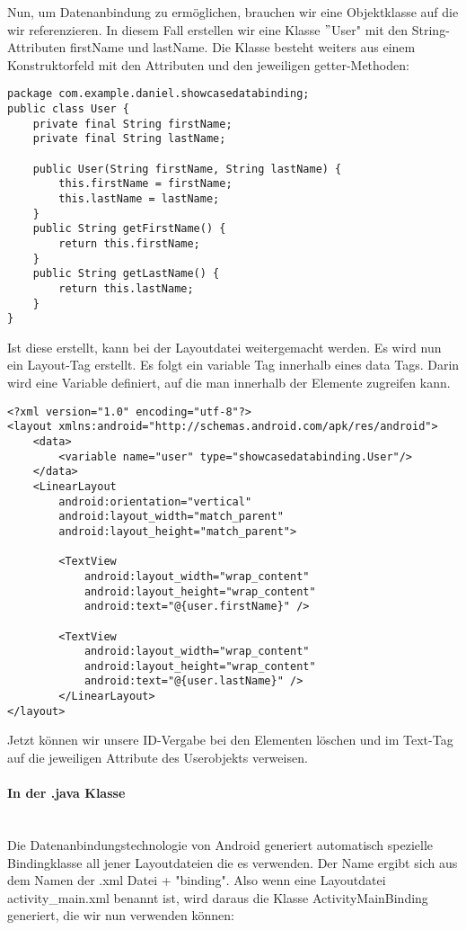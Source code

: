 \documentclass[FIPLY_base.tex]{subfiles}
\begin{document}
Nun, um Datenanbindung zu ermöglichen, brauchen wir eine Objektklasse auf die wir referenzieren. In diesem Fall erstellen wir eine Klasse $"$User" mit den String-Attributen firstName und lastName. Die Klasse besteht weiters aus einem Konstruktorfeld mit den Attributen und den jeweiligen getter-Methoden: 

\begin{lstlisting}[caption={Unsere Objektklasse die bei der Datenanbindung referenziert wird.},label=DescriptiveLabel]
package com.example.daniel.showcasedatabinding;
public class User {
    private final String firstName;
    private final String lastName;

    public User(String firstName, String lastName) {
        this.firstName = firstName;
        this.lastName = lastName;
    }
    public String getFirstName() {
        return this.firstName;
    }
    public String getLastName() {
        return this.lastName;
    }
}
\end{lstlisting}

Ist diese erstellt, kann bei der Layoutdatei weitergemacht werden. Es wird nun ein Layout-Tag erstellt. Es folgt ein variable Tag innerhalb eines data Tags. Darin wird eine Variable definiert, auf die man innerhalb der Elemente zugreifen kann.

\begin{lstlisting}[caption={Die XML Datei nach der Integration einer Datenanbindung.},label=DescriptiveLabel]
<?xml version="1.0" encoding="utf-8"?>
<layout xmlns:android="http://schemas.android.com/apk/res/android">
    <data>
	    <variable name="user" type="showcasedatabinding.User"/>
    </data>
    <LinearLayout
	    android:orientation="vertical"
	    android:layout_width="match_parent"
	    android:layout_height="match_parent">
    
	    <TextView
	        android:layout_width="wrap_content"
	        android:layout_height="wrap_content"
	        android:text="@{user.firstName}" />
		    
	    <TextView
	        android:layout_width="wrap_content"
	        android:layout_height="wrap_content"
	        android:text="@{user.lastName}" />
	    </LinearLayout>
</layout>
\end{lstlisting}


Jetzt können wir unsere ID-Vergabe bei den Elementen löschen und im Text-Tag auf die jeweiligen Attribute des Userobjekts verweisen.

\newpage
\paragraph{In der .java Klasse}
\ \\
Die Datenanbindungstechnologie von Android generiert automatisch spezielle Bindingklasse all jener Layoutdateien die es verwenden. Der Name ergibt sich aus dem Namen der .xml Datei + "binding". Also wenn eine Layoutdatei activity\_main.xml benannt ist, wird daraus die Klasse ActivityMainBinding generiert, die wir nun verwenden können:
\end{document}
